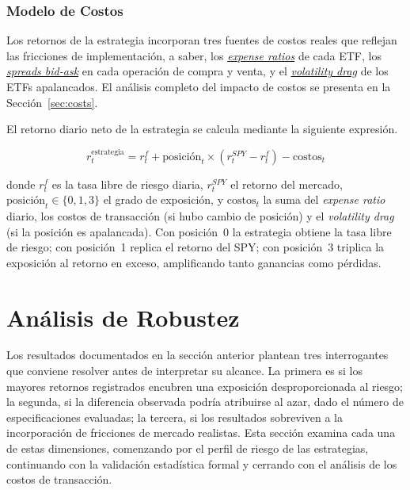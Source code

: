 ﻿\documentclass[11pt,a4paper]{article}
\begin{document}
\subsubsection{Modelo de Costos}

Los retornos de la estrategia incorporan tres fuentes de costos reales que reflejan las fricciones de implementaci\'on, a saber, los \hyperlink{glos:expense_ratio}{\textit{expense ratios}} de cada ETF, los \hyperlink{glos:spread_bidask}{\textit{spreads bid-ask}} en cada operaci\'on de compra y venta, y el \hyperlink{glos:vol_drag}{\textit{volatility drag}} de los ETFs apalancados. El an\'alisis completo del impacto de costos se presenta en la Secci\'on~\ref{sec:costs}.

El retorno diario neto de la estrategia se calcula mediante la siguiente expresi\'on.

\begin{equation}
r_t^{\text{estrategia}} = r_t^f + \text{posici\'on}_t \times (r_t^{SPY} - r_t^f) - \text{costos}_t
\label{eq:strategy_return}
\end{equation}

\noindent donde $r_t^f$ es la tasa libre de riesgo diaria, $r_t^{SPY}$ el retorno del mercado, $\text{posici\'on}_t \in \{0, 1, 3\}$ el grado de exposici\'on, y $\text{costos}_t$ la suma del \textit{expense ratio} diario, los costos de transacci\'on (si hubo cambio de posici\'on) y el \textit{volatility drag} (si la posici\'on es apalancada). Con posici\'on~0 la estrategia obtiene la tasa libre de riesgo; con posici\'on~1 replica el retorno del SPY; con posici\'on~3 triplica la exposici\'on al retorno en exceso, amplificando tanto ganancias como p\'erdidas.




\section{An\'alisis de Robustez}
\label{sec:robustness}

Los resultados documentados en la secci\'on anterior plantean tres interrogantes que conviene resolver antes de interpretar su alcance. La primera es si los mayores retornos registrados encubren una exposici\'on desproporcionada al riesgo; la segunda, si la diferencia observada podr\'ia atribuirse al azar, dado el n\'umero de especificaciones evaluadas; la tercera, si los resultados sobreviven a la incorporaci\'on de fricciones de mercado realistas. Esta secci\'on examina cada una de estas dimensiones, comenzando por el perfil de riesgo de las estrategias, continuando con la validaci\'on estad\'istica formal y cerrando con el an\'alisis de los costos de transacci\'on.
\end{document}
